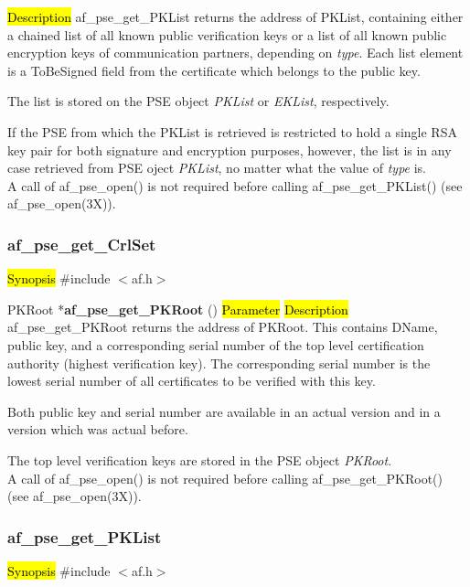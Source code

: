 \hl{Description}
af\_pse\_get\_PKList returns the address of PKList, containing either a chained list of all known
public verification keys or a list of all known public encryption keys of communication partners,
depending on {\em type}.
Each list element is a ToBeSigned field from the certificate which belongs to the public key.
 
The list is stored on the PSE object {\em PKList} or {\em EKList}, respectively.

If the PSE from which the PKList is retrieved is restricted to hold a single RSA key pair
for both signature and encryption purposes, however, the list is in any case retrieved from PSE oject {\em PKList},
no matter what the value of {\em type} is.
\\ [1em]
A call of af\_pse\_open() is not required before calling af\_pse\_get\_PKList()
(see af\_pse\_open(3X)).


\subsubsection{af\_pse\_get\_CrlSet}
\label{af_get_PKRoot}
\hl{Synopsis}
\#include $<$af.h$>$

PKRoot *{\bf af\_pse\_get\_PKRoot} ()
\hl{Parameter}
\hl{Description}
af\_pse\_get\_PKRoot returns the address of PKRoot. This contains DName, public key, and a corresponding
serial number of the top level certification authority (highest verification key).
The corresponding serial number is the lowest serial number of all certificates to be 
verified with this key.

Both public key and serial number are available in an actual version and in a version which was
actual before.

The top level verification keys are stored in the PSE object
{\em PKRoot}.
\\ [1em]
A call of af\_pse\_open() is not required before calling af\_pse\_get\_PKRoot()
(see af\_pse\_open(3X)).


\subsubsection{af\_pse\_get\_PKList}
\label{af_get_QuipuPWD}
\hl{Synopsis}
\#include $<$af.h$>$


